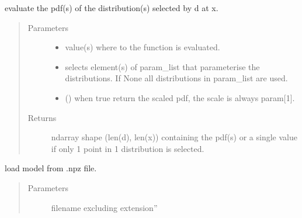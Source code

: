 \documentclass[letterpaper,10pt,english]{sphinxmanual}
\begin{document}
\begin{fulllineitems}
\begin{fulllineitems}
\label{\detokenize{tes:tes.analysis.MixtureModel.cdf}}
\sphinxAtStartPar
evaluate the pdf(s) of the distribution(s) selected by d at x.
\begin{quote}\begin{description}
\item[{Parameters}] \leavevmode\begin{itemize}
\item {} 
\sphinxAtStartPar
{} \textendash{} value(s) where to the function is evaluated.

\item {} 
\sphinxAtStartPar
{} \textendash{} selects element(s) of param\_list that parameterise the
distributions. If None all distributions in param\_list are
used.

\item {} 
\sphinxAtStartPar
{} () \textendash{} when true return the scaled pdf, the scale is always
param{[}\sphinxhyphen{}1{]}.

\end{itemize}

\item[{Returns}] \leavevmode
\sphinxAtStartPar
ndarray shape (len(d), len(x)) containing the pdf(s) or a
single value if only 1 point in 1 distribution is selected.

\end{description}\end{quote}

\end{fulllineitems}


\begin{fulllineitems}
\label{\detokenize{tes:tes.analysis.MixtureModel.load}}
\sphinxAtStartPar
load model from .npz file.
\begin{quote}\begin{description}
\item[{Parameters}] \leavevmode
\sphinxAtStartPar
{} \textendash{} filename excluding extension”


\end{description}
\end{quote}
\end{fulllineitems}
\end{fulllineitems}
\end{document}
